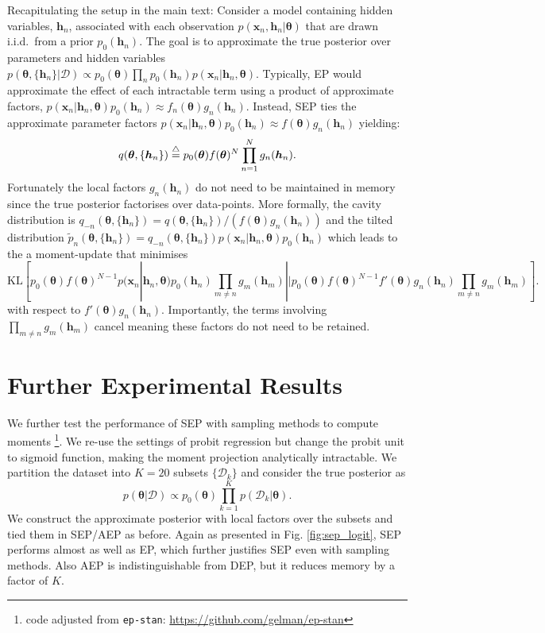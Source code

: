 \documentclass{article} %
\begin{document}
Recapitulating the setup in the main text: Consider a model containing hidden variables, $\bm{h}_n$, associated with each observation $p(\bm{x}_n, \bm{h}_n | \bm{\theta})$  that are drawn i.i.d.~from a prior $p_0(\bm{h}_n)$. The goal is to approximate the true posterior over parameters and hidden variables $p(\bm{\theta}, \{ \bm{h}_n\} | \mathcal{D}) \propto p_0(\bm{\theta}) \prod_n p_0(\bm{h}_n) p(\bm{x}_n | \bm{h}_n, \bm{\theta})$. 
%
Typically, EP would approximate the effect of each intractable term using a product of approximate factors, $p(\bm{x}_n | \bm{h}_n, \bm{\theta})p_0(\bm{h}_n)  \approx f_n(\bm{\theta}) g_n(\bm{h}_n) $. Instead, SEP ties the approximate parameter factors $p(\bm{x}_n | \bm{h}_n, \bm{\theta})p_0(\bm{h}_n)  \approx f(\bm{\theta}) g_n(\bm{h}_n) $ yielding:
%
\begin{equation}
q(\bm{\theta}, \{ \bm{h}_n\}) \buildrel\triangle\over = p_0(\bm{\theta}) f(\bm{\theta})^N \prod_{n=1}^N g_n(\bm{h}_n) .
\end{equation}
%
Fortunately the local factors $g_n(\bm{h}_n)$ do not need to be maintained in memory since the true posterior factorises over data-points. More formally, the cavity distribution is $q_{-n}(\bm{\theta}, \{ \bm{h}_n\}) = q(\bm{\theta}, \{ \bm{h}_n\})/(f(\bm{\theta}) g_n(\bm{h}_n)) $ and the tilted distribution $\tilde{p}_n(\bm{\theta}, \{ \bm{h}_n\}) = q_{-n}(\bm{\theta}, \{ \bm{h}_n\}) p(\bm{x}_n | \bm{h}_n, \bm{\theta})p_0(\bm{h}_n)$ which leads to the a moment-update that minimises 
%
\begin{equation}
\mathrm{KL}[ p_0(\bm{\theta}) f(\bm{\theta})^{N-1} p(\bm{x}_n | \bm{h}_n, \bm{\theta})p_0(\bm{h}_n) \prod_{m\ne n} g_m(\bm{h}_m) || p_0(\bm{\theta}) f(\bm{\theta})^{N-1} f'(\bm{\theta}) g_n(\bm{h}_n) \prod_{m\ne n} g_m(\bm{h}_m)] .\nonumber
\end{equation}
%
with respect to $f'(\bm{\theta}) g_n(\bm{h}_n)$. Importantly, the terms involving $\prod_{m\ne n} g_m(\bm{h}_m)$ cancel meaning these factors do not need to be retained.



\section{Further Experimental Results}
We further test the performance of SEP with sampling methods to compute moments \footnote{code adjusted from \texttt{ep-stan}: \url{https://github.com/gelman/ep-stan}}. We re-use the settings of probit regression but change the probit unit to sigmoid function, making the moment projection analytically intractable. We partition the dataset into $K = 20$ subsets $\{\mathcal{D}_k\}$ and consider the true posterior as
\begin{equation}
p(\bm{\theta}|\mathcal{D}) \propto p_0(\bm{\theta}) \prod_{k=1}^K p(\mathcal{D}_k|\bm{\theta}).
\end{equation}
We construct the approximate posterior with local factors over the subsets and tied them in SEP/AEP as before. Again as presented in Fig. \ref{fig:sep_logit}, SEP performs almost as well as EP, which further justifies SEP even with sampling methods. Also AEP is indistinguishable from DEP, but it reduces memory by a factor of $K$.
\end{document}
